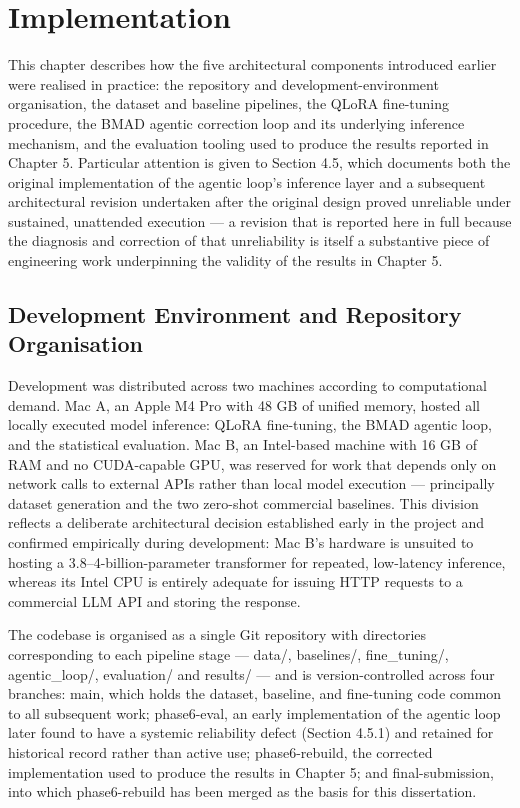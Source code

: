 \chapter{Implementation}

This chapter describes how the five architectural components introduced
earlier were realised in practice: the repository and
development-environment organisation, the dataset and baseline
pipelines, the QLoRA fine-tuning procedure, the BMAD agentic correction
loop and its underlying inference mechanism, and the evaluation tooling
used to produce the results reported in Chapter 5. Particular attention
is given to Section 4.5, which documents both the original
implementation of the agentic loop's inference layer and a subsequent
architectural revision undertaken after the original design proved
unreliable under sustained, unattended execution --- a revision that is
reported here in full because the diagnosis and correction of that
unreliability is itself a substantive piece of engineering work
underpinning the validity of the results in Chapter 5.

\section{Development Environment and Repository Organisation}

Development was distributed across two machines according to
computational demand. Mac A, an Apple M4 Pro with 48 GB of unified
memory, hosted all locally executed model inference: QLoRA fine-tuning,
the BMAD agentic loop, and the statistical evaluation. Mac B, an
Intel-based machine with 16 GB of RAM and no CUDA-capable GPU, was
reserved for work that depends only on network calls to external APIs
rather than local model execution --- principally dataset generation and
the two zero-shot commercial baselines. This division reflects a
deliberate architectural decision established early in the project and
confirmed empirically during development: Mac B's hardware is unsuited
to hosting a 3.8--4-billion-parameter transformer for repeated,
low-latency inference, whereas its Intel CPU is entirely adequate for
issuing HTTP requests to a commercial LLM API and storing the response.

The codebase is organised as a single Git repository with directories
corresponding to each pipeline stage --- data/, baselines/,
fine\_tuning/, agentic\_loop/, evaluation/ and results/ --- and is
version-controlled across four branches: main, which holds the dataset,
baseline, and fine-tuning code common to all subsequent work;
phase6-eval, an early implementation of the agentic loop later found to
have a systemic reliability defect (Section 4.5.1) and retained for
historical record rather than active use; phase6-rebuild, the corrected
implementation used to produce the results in Chapter 5; and
final-submission, into which phase6-rebuild has been merged as the basis
for this dissertation.

